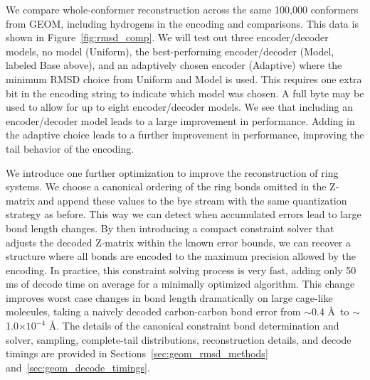 \documentclass[%
 preprint,
superscriptaddress,
 amsmath,amssymb,
 aip,
 jcp,
]{revtex4-2}
\begin{document}
We compare whole-conformer reconstruction across the same 100,000 conformers from GEOM, including hydrogens in the encoding and comparisons.
This data is shown in Figure~\ref{fig:rmsd_comp}.
We will test out three encoder/decoder models, no model (Uniform), the best-performing encoder/decoder (Model, labeled Base above), and an adaptively chosen encoder (Adaptive) where the minimum RMSD choice from Uniform and Model is used. 
This requires one extra bit in the encoding string to indicate which model was chosen.
A full byte may be used to allow for up to eight encoder/decoder models.
We see that including an encoder/decoder model leads to a large improvement in performance.
Adding in the adaptive choice leads to a further improvement in performance, improving the tail behavior of the encoding.

We introduce one further optimization to improve the reconstruction of ring systems.
We choose a canonical ordering of the ring bonds omitted in the Z-matrix and append these values to the bye stream with the same quantization strategy as before.
This way we can detect when accumulated errors lead to large bond length changes.
By then introducing a compact constraint solver that adjusts the decoded Z-matrix within the known error bounds, we can recover a structure where all bonds are encoded to the maximum precision allowed by the encoding.
In practice, this constraint solving process is very fast, adding only 50 ms of decode time on average for a minimally optimized algorithm.
This change improves worst case changes in bond length dramatically on large cage-like molecules, taking a naively decoded carbon-carbon bond error from $\sim$0.4 \AA\ to $\sim$1.0$\times10^{-4}$ \AA{}.
The details of the canonical constraint bond determination and solver, sampling, complete-tail distributions, reconstruction details, and decode timings are provided in Sections~\ref{sec:geom_rmsd_methods} and~\ref{sec:geom_decode_timings}.

\end{document}
